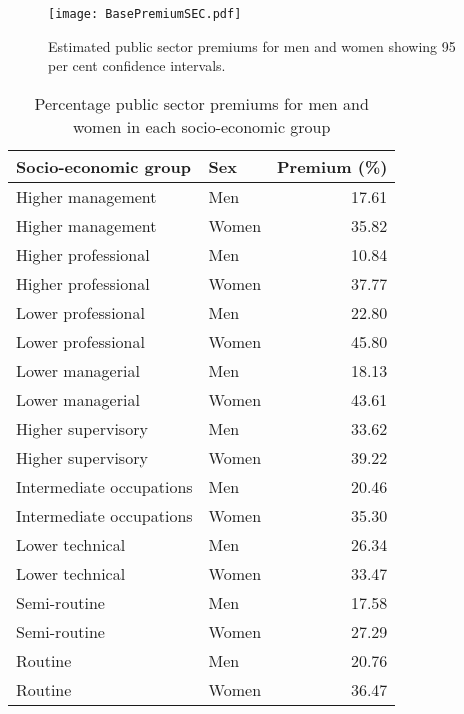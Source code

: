 \documentclass[a4paper,11pt,titlepage]{article}
\begin{document}
\begin{figure}[ht]
    \texttt{[image: BasePremiumSEC.pdf]}
    \caption{Estimated public sector premiums for men and women showing 95 per cent
    confidence intervals.\label{fig:base}}
\end{figure}

\begin{table}[ht]
\caption{Percentage public sector premiums for men and women in each socio-economic group \label{tab:baseprem}}
\begin{center}
\begin{tabular}{llr}
  \toprule
  Socio-economic group & Sex & Premium (\%) \\
  \midrule
  Higher management & Men & 17.61 \\
  Higher management & Women & 35.82 \\
  Higher professional & Men & 10.84 \\
  Higher professional & Women & 37.77 \\
  Lower professional & Men & 22.80 \\
  Lower professional & Women & 45.80 \\
  Lower managerial & Men & 18.13 \\
  Lower managerial & Women & 43.61 \\
  Higher supervisory & Men & 33.62 \\
  Higher supervisory & Women & 39.22 \\
  Intermediate occupations & Men & 20.46 \\
  Intermediate occupations & Women & 35.30 \\
  Lower technical & Men & 26.34 \\
  Lower technical & Women & 33.47 \\
  Semi-routine & Men & 17.58 \\
  Semi-routine & Women & 27.29 \\
  Routine & Men & 20.76 \\
  Routine & Women & 36.47 \\
\bottomrule
\end{tabular}
\end{center}
\end{table}
\end{document}
